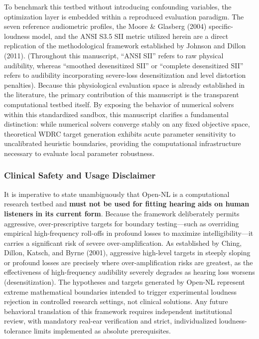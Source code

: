 \documentclass[
  12pt,
]{article}
\begin{document}
To benchmark this testbed without introducing confounding variables, the
optimization layer is embedded within a reproduced evaluation paradigm.
The seven reference audiometric profiles, the Moore \& Glasberg (2004)
specific-loudness model, and the ANSI S3.5 SII metric utilized herein
are a direct replication of the methodological framework established by
Johnson and Dillon (2011). (Throughout this manuscript, ``ANSI SII''
refers to raw physical audibility, whereas ``smoothed desensitized SII''
or ``complete desensitized SII'' refers to audibility incorporating
severe-loss desensitization and level distortion penalties). Because
this physiological evaluation space is already established in the
literature, the primary contribution of this manuscript is the
transparent computational testbed itself. By exposing the behavior of
numerical solvers within this standardized sandbox, this manuscript
clarifies a fundamental distinction: while numerical solvers converge
stably on any fixed objective space, theoretical WDRC target generation
exhibits acute parameter sensitivity to uncalibrated heuristic
boundaries, providing the computational infrastructure necessary to
evaluate local parameter robustness.

\subsubsection{Clinical Safety and Usage
Disclaimer}\label{clinical-safety-and-usage-disclaimer}

It is imperative to state unambiguously that Open-NL is a computational
research testbed and \textbf{must not be used for fitting hearing aids
on human listeners in its current form}. Because the framework
deliberately permits aggressive, over-prescriptive targets for boundary
testing---such as overriding empirical high-frequency roll-offs in
profound losses to maximize intelligibility---it carries a significant
risk of severe over-amplification. As established by Ching, Dillon,
Katsch, and Byrne (2001), aggressive high-level targets in steeply
sloping or profound losses are precisely where over-amplification risks
are greatest, as the effectiveness of high-frequency audibility severely
degrades as hearing loss worsens (desensitization). The hypotheses and
targets generated by Open-NL represent extreme mathematical boundaries
intended to trigger experimental loudness rejection in controlled
research settings, not clinical solutions. Any future behavioral
translation of this framework requires independent institutional review,
with mandatory real-ear verification and strict, individualized
loudness-tolerance limits implemented as absolute prerequisites.
\end{document}
